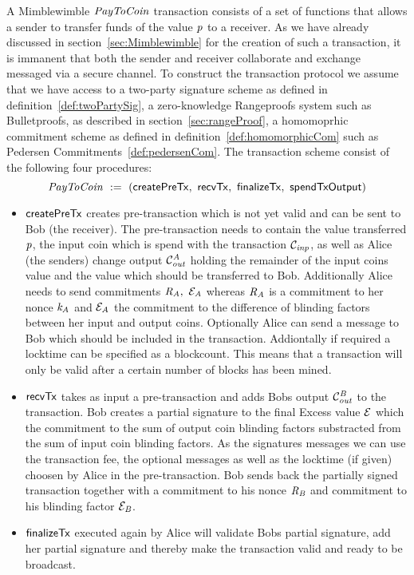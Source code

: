 \begin{definition}[$\cnstPayToCoin$]
    A Mimblewimble $\cnstPayToCoin$ transaction consists of a set of functions that allows a sender to transfer funds of the value $\mathit{p}$ to a receiver.
    As we have already discussed in section~\ref{sec:Mimblewimble} for the creation of such a transaction, it is immanent that both the sender and receiver collaborate and exchange messaged via a secure channel.
    To construct the transaction protocol we assume that we have access to a two-party signature scheme as defined in definition~\ref{def:twoPartySig}, a zero-knowledge Rangeproofs system such as Bulletproofs, as
    described in section~\ref{sec:rangeProof}, a homomoprhic commitment scheme as defined in definition~\ref{def:homomorphicCom} such as Pedersen Commitments~\ref{def:pedersenCom}.
    The transaction scheme consist of the following four procedures:
    \[ \mathit{PayToCoin} ~:=~ (\mathsf{createPreTx} ,~ \mathsf{recvTx} ,~ \mathsf{finalizeTx} ,~ \mathsf{spendTxOutput}) \]
    \begin{itemize}
        \item $\mathsf{createPreTx}$ creates pre-transaction which is not yet valid and can be sent to Bob (the receiver). The pre-transaction needs to contain the value transferred $\mathit{p}$, the input coin which
        is spend with the transaction $\mathcal{C}_{\mathit{inp}}$, as well as Alice (the senders) change output $\mathcal{C}_{\mathit{out}}^{\mathit{A}}$ holding the remainder of the input coins value and the value which should be transferred to Bob.
        Additionally Alice needs to send commitments $\mathit{R}_{\mathit{A}} ,~ \mathcal{E}_{\mathit{A}}$ whereas $\mathit{R}_{\mathit{A}}$ is a commitment to her nonce $\mathit{\mathit{k}_{\mathit{A}}}$ and $\mathcal{E}_{\mathit{A}}$ the commitment to
        the difference of blinding factors between her input and output coins. Optionally Alice can send a message to Bob which should be included in the transaction. Addiontally if required a locktime can be
        specified as a blockcount. This means that a transaction will only be valid after a certain number of blocks has been mined.
        \item $\mathsf{recvTx}$ takes as input a pre-transaction and adds Bobs output $\mathcal{C}_{\mathit{out}}^{\mathit{B}}$ to the transaction. Bob creates a partial signature to the final Excess value $\mathcal{E}$ which the commitment
        to the sum of output coin blinding factors substracted from the sum of input coin blinding factors. As the signatures messages we can use the transaction fee, the optional messages as well as
        the locktime (if given) choosen by Alice in the pre-transaction.
        Bob sends back the partially signed transaction together with a commitment to his nonce $\mathit{R}_{\mathit{B}}$ and commitment to his blinding factor $\mathcal{E}_{\mathit{B}}$.
        \item $\mathsf{finalizeTx}$ executed again by Alice will validate Bobs partial signature, add her partial signature and thereby make the transaction valid and ready to be broadcast.
    \end{itemize}
\end{definition}

